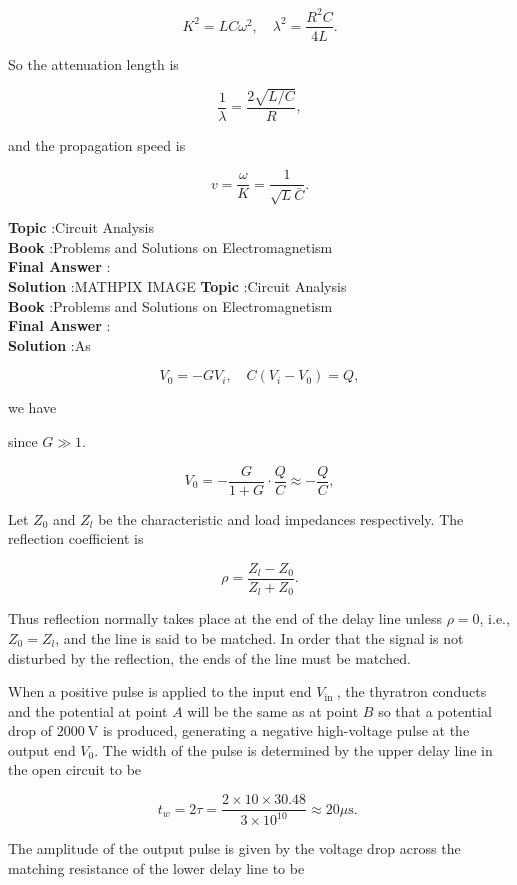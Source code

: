 \documentclass[10pt]{article}
\begin{document}
$$
K^{2}=L C \omega^{2}, \quad \lambda^{2}=\frac{R^{2} C}{4 L} .
$$

So the attenuation length is

$$
\frac{1}{\lambda}=\frac{2 \sqrt{L / C}}{R},
$$

and the propagation speed is

$$
v=\frac{\omega}{K}=\frac{1}{\sqrt{L} \bar{C}} .
$$

\textbf{Topic} :Circuit Analysis\\
\textbf{Book} :Problems and Solutions on Electromagnetism\\
\textbf{Final Answer} :\\


\textbf{Solution} :MATHPIX IMAGE
\textbf{Topic} :Circuit Analysis\\
\textbf{Book} :Problems and Solutions on Electromagnetism\\
\textbf{Final Answer} :\\


\textbf{Solution} :As

$$
V_{0}=-G V_{i}, \quad C\left(V_{i}-V_{0}\right)=Q,
$$

we have

since $G \gg 1$.

$$
V_{0}=-\frac{G}{1+G} \cdot \frac{Q}{C} \approx-\frac{Q}{C},
$$

 Let $Z_{0}$ and $Z_{l}$ be the characteristic and load impedances respectively. The reflection coefficient is

$$
\rho=\frac{Z_{l}-Z_{0}}{Z_{l}+Z_{0}} .
$$

Thus reflection normally takes place at the end of the delay line unless $\rho=0$, i.e., $Z_{0}=Z_{l}$, and the line is said to be matched. In order that the signal is not disturbed by the reflection, the ends of the line must be matched.

 When a positive pulse is applied to the input end $V_{\text {in }}$, the thyratron conducts and the potential at point $A$ will be the same as at point $B$ so that a potential drop of $2000 \mathrm{~V}$ is produced, generating a negative high-voltage pulse at the output end $V_{0}$. The width of the pulse is determined by the upper delay line in the open circuit to be

$$
t_{w}=2 \tau=\frac{2 \times 10 \times 30.48}{3 \times 10^{10}} \approx 20 \mu \mathrm{s} \text {. }
$$

The amplitude of the output pulse is given by the voltage drop across the matching resistance of the lower delay line to be
\end{document}
